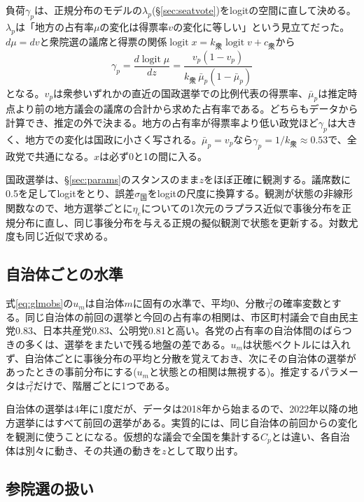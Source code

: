 \documentclass[a4paper,11pt]{ltjsarticle}
\begin{document}
負荷$\gamma_p$は、正規分布のモデルの$\lambda_p$(\S\ref{sec:seatvote})をlogitの空間に直して決める。$\lambda_p$は「地方の占有率$\mu$の変化は得票率$v$の変化に等しい」という見立てだった。$d\mu=dv$と衆院選の議席と得票の関係$\operatorname{logit}x=k_{\text{衆}}\operatorname{logit}v+c_{\text{衆}}$から
\begin{equation}
  \gamma_p = \frac{d\operatorname{logit}\mu}{dz} = \frac{v_p(1-v_p)}{k_{\text{衆}}\,\bar\mu_p(1-\bar\mu_p)}
  \label{eq:gammap}
\end{equation}
となる。$v_p$は衆参いずれかの直近の国政選挙での比例代表の得票率、$\bar\mu_p$は推定時点より前の地方議会の議席の合計から求めた占有率である。どちらもデータから計算でき、推定の外で決まる。地方の占有率が得票率より低い政党ほど$\gamma_p$は大きく、地方での変化は国政に小さく写される。$\bar\mu_p=v_p$なら$\gamma_p=1/k_{\text{衆}}\approx0.53$で、全政党で共通になる。$x$は必ず0と1の間に入る。

国政選挙は、\S\ref{sec:params}のスタンスのまま$z$をほぼ正確に観測する。議席数に0.5を足してlogitをとり、誤差$\sigma_{\text{国}}$をlogitの尺度に換算する。観測が状態の非線形関数なので、地方選挙ごとに$\eta_e$についての1次元のラプラス近似で事後分布を正規分布に直し、同じ事後分布を与える正規の擬似観測で状態を更新する。対数尤度も同じ近似で求める。

\subsection{自治体ごとの水準}

式\eqref{eq:glmobs}の$u_m$は自治体$m$に固有の水準で、平均0、分散$\tau_\ell^2$の確率変数とする。同じ自治体の前回の選挙と今回の占有率の相関は、市区町村議会で自由民主党0.83、日本共産党0.83、公明党0.81と高い。各党の占有率の自治体間のばらつきの多くは、選挙をまたいで残る地盤の差である。$u_m$は状態ベクトルには入れず、自治体ごとに事後分布の平均と分散を覚えておき、次にその自治体の選挙があったときの事前分布にする($u_m$と状態との相関は無視する)。推定するパラメータは$\tau_\ell^2$だけで、階層ごとに1つである。

自治体の選挙は4年に1度だが、データは2018年から始まるので、2022年以降の地方選挙にはすべて前回の選挙がある。実質的には、同じ自治体の前回からの変化を観測に使うことになる。仮想的な議会で全国を集計する$C_p$とは違い、各自治体は別々に動き、その共通の動きを$z$として取り出す。

\subsection{参院選の扱い}
\end{document}
